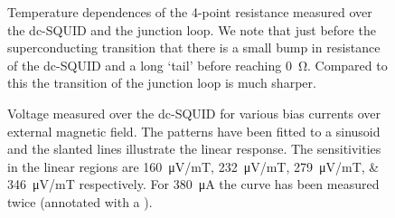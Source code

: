 \begin{figure}[h]
	\centering
	
	\caption{Temperature dependences of the 4-point resistance measured over the dc-SQUID and the junction loop. We note that just before the superconducting transition that there is a small bump in resistance of the dc-SQUID and a long `tail' before reaching \qty{0}{\ohm}. Compared to this the transition of the junction loop is much sharper.}
	\label{fig:CP2.6B_RT_curves}
\end{figure}


\begin{figure}[h]
	\centering
	
	\caption{Voltage measured over the dc-SQUID for various bias currents over external magnetic field. The patterns have been fitted to a sinusoid and the slanted lines illustrate the linear response. The sensitivities in the linear regions are \qtylist{160;232;279;346}{\micro\volt/\milli\tesla} respectively. For \qty{380}{\micro\ampere} the curve has been measured twice (annotated with a \dag).}
	\label{fig:CP2.6B_SQUID_calibration_curves}
\end{figure}


